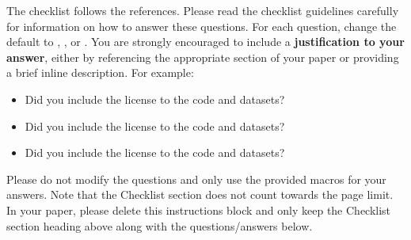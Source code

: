\documentclass{article}
\begin{document}
The checklist follows the references.  Please
read the checklist guidelines carefully for information on how to answer these
questions.  For each question, change the default \answerTODO{} to \answerYes{},
\answerNo{}, or \answerNA{}.  You are strongly encouraged to include a {\bf
justification to your answer}, either by referencing the appropriate section of
your paper or providing a brief inline description.  For example:
\begin{itemize}
  \item Did you include the license to the code and datasets? 
  \item Did you include the license to the code and datasets? 
  \item Did you include the license to the code and datasets? \answerNA{}
\end{itemize}
Please do not modify the questions and only use the provided macros for your
answers.  Note that the Checklist section does not count towards the page
limit.  In your paper, please delete this instructions block and only keep the
Checklist section heading above along with the questions/answers below.
\end{document}
